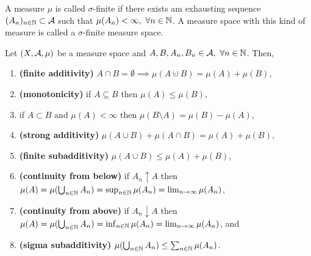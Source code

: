 \newcommand{\sigfin}{$\sigma$-finite }
\begin{dfn}
	A measure $\mu$ is called $\sigma$-finite if there exists am exhausting sequence $(A_n)_{n \in \mathbb{N}} \subset \mathcal{A}$ such that $\mu(A_n) < \infty,\ \forall n \in \mathbb{N}$. A measure space with this kind of measure is called a \sigfin  measure space.
\end{dfn}

\begin{thm}
	Let $(X, \mathcal{A}, \mu)$ be a measure space and $A, B, A_n, B_n \in \mathcal{A},\ \forall n \in \mathbb{N}$. Then,
	\begin{enumerate}
		\item \textbf{(finite additivity)} $A \cap B = \emptyset \implies \mu(A \cupdot B) = \mu(A) + \mu(B)$,
		\item \textbf{(monotonicity)} if $A \subseteq B$ then $\mu(A) \leq \mu(B)$,
		\item if $A \subset B$ and $\mu(A) < \infty$ then $\mu(B\setminus A) = \mu(B) - \mu(A)$,
		\item \textbf{(strong additivity)} $\mu(A \cup B) + \mu(A \cap B) = \mu(A) + \mu(B)$,
		\item \textbf{(finite subadditivity)} $\mu(A \cup B) \leq \mu(A) + \mu(B)$,
		\item \textbf{(continuity from below)} if $A_n \uparrow A$ then $\mu(A) = \mu(\bigcup_{n \in \mathbb{N}} A_n) = \sup_{n\in\mathbb{N}} \mu(A_n) = \lim_{n\to \infty} \mu(A_n)$,
		\item \textbf{(continuity from above)} if $A_n \downarrow A$ then $\mu(A) = \mu(\bigcup_{n \in \mathbb{N}} A_n) = \inf_{n\in\mathbb{N}} \mu(A_n) = \lim_{n\to \infty} \mu(A_n)$, and
		\item \textbf{(sigma subadditivity)} $\mu(\bigcup_{n \in \mathbb{N}} A_n) \leq \sum_{n\in \mathbb{N}} \mu(A_n)$.
	\end{enumerate}


\end{thm}
